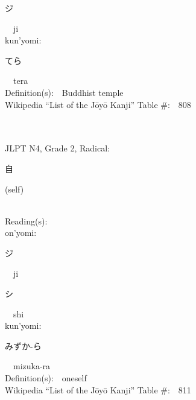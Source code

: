 \begin{multicols}{2}
{\hspace*{2em}}{\begin{CJK}{UTF8}{min} ジ \end{CJK}}\ \ ji\ \ \\
{\hspace*{1em}}kun'yomi:\ \ \\
{\hspace*{2em}}{\begin{CJK}{UTF8}{min} てら \end{CJK}}\ \ tera\ \ \\
Definition(s):\ \ Buddhist temple \\
Wikipedia ``List of the J\=oy\=o Kanji'' Table \#:\ \ 808 \\
\ \ \\
{\fontsize{34pt}{40pt}  }\ \ \\  %
{JLPT N4, Grade 2, Radical:\ \ {\begin{CJK}{UTF8}{min} 自 \end{CJK}} (self) } \\
Reading(s):\ \ \\
{\hspace*{1em}}on'yomi:\ \ \\
{\hspace*{2em}}{\begin{CJK}{UTF8}{min} ジ \end{CJK}}\ \ ji\ \ \\
{\hspace*{2em}}{\begin{CJK}{UTF8}{min} シ \end{CJK}}\ \ shi\ \ \\
{\hspace*{1em}}kun'yomi:\ \ \\
{\hspace*{2em}}{\begin{CJK}{UTF8}{min} みずか-ら \end{CJK}}\ \ mizuka-ra\ \ \\
Definition(s):\ \ oneself \\
Wikipedia ``List of the J\=oy\=o Kanji'' Table \#:\ \ 811 \\
\ \ \\
{\fontsize{34pt}{40pt}  }\ \ \\  %

\end{multicols}
